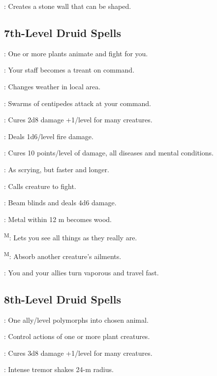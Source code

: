 : Creates a stone wall that can be shaped.



\subsection{7th-Level Druid Spells}

: One or more plants animate and fight for you.

: Your staff becomes a treant on command.

: Changes weather in local area.

: Swarms of centipedes attack at your command.

: Cures 2d8 damage +1/level for many creatures.

: Deals 1d6/level fire damage.

: Cures 10 points/level of damage, all diseases and mental conditions.

: As scrying, but faster and longer.

: Calls creature to fight.

: Beam blinds and deals 4d6 damage.

: Metal within 12 m becomes wood.

\textsuperscript{M}: Lets you see all things as they really are.

\textsuperscript{M}: Absorb another creature’s ailments.

: You and your allies turn vaporous and travel fast.



\subsection{8th-Level Druid Spells}

: One ally/level polymorphs into chosen animal.

: Control actions of one or more plant creatures.

: Cures 3d8 damage +1/level for many creatures.

: Intense tremor shakes 24-m radius.

